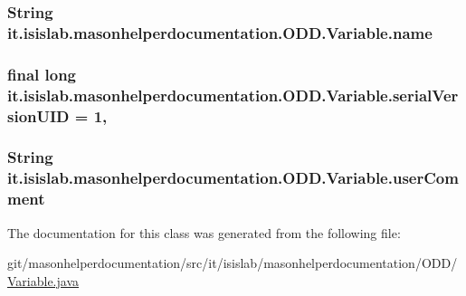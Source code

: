 \hypertarget{classit_1_1isislab_1_1masonhelperdocumentation_1_1_o_d_d_1_1_variable_acf7d0255e957f01bd74e72a81209d3ad}{
\subsubsection[{name}]{\setlength{\rightskip}{0pt plus 5cm}String it.\-isislab.\-masonhelperdocumentation.\-O\-D\-D.\-Variable.\-name\hspace{0.3cm}{\ttfamily [private]}}}\label{classit_1_1isislab_1_1masonhelperdocumentation_1_1_o_d_d_1_1_variable_acf7d0255e957f01bd74e72a81209d3ad}
\hypertarget{classit_1_1isislab_1_1masonhelperdocumentation_1_1_o_d_d_1_1_variable_a56e60bd2a6d65b85d1a67bc61a3c204c}{
\subsubsection[{serial\-Version\-U\-I\-D}]{\setlength{\rightskip}{0pt plus 5cm}final long it.\-isislab.\-masonhelperdocumentation.\-O\-D\-D.\-Variable.\-serial\-Version\-U\-I\-D = 1\hspace{0.3cm}{\ttfamily [static]}, {\ttfamily [private]}}}\label{classit_1_1isislab_1_1masonhelperdocumentation_1_1_o_d_d_1_1_variable_a56e60bd2a6d65b85d1a67bc61a3c204c}
\hypertarget{classit_1_1isislab_1_1masonhelperdocumentation_1_1_o_d_d_1_1_variable_abc4f019f82f47614b2b62743799dc7b5}{
\subsubsection[{user\-Comment}]{\setlength{\rightskip}{0pt plus 5cm}String it.\-isislab.\-masonhelperdocumentation.\-O\-D\-D.\-Variable.\-user\-Comment\hspace{0.3cm}{\ttfamily [package]}}}\label{classit_1_1isislab_1_1masonhelperdocumentation_1_1_o_d_d_1_1_variable_abc4f019f82f47614b2b62743799dc7b5}


The documentation for this class was generated from the following file\-:\begin{DoxyCompactItemize}
\item 
git/masonhelperdocumentation/src/it/isislab/masonhelperdocumentation/\-O\-D\-D/\hyperlink{_variable_8java}{Variable.\-java}\end{DoxyCompactItemize}

